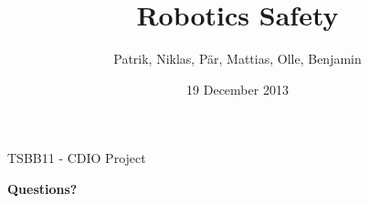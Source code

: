 \documentclass{beamer}
\title[Mister Roboto]{Robotics Safety}
\author{Patrik, Niklas, Pär, Mattias, Olle, Benjamin}
\institute{Computer Vision}
\date{19 December 2013 }
\begin{document}
\begin{frame}{TSBB11 - CDIO Project}
	\titlepage
\end{frame}












\begin{frame}
	\Huge
	\centering
	\textbf{Questions?}
\end{frame}
 
\end{document}
